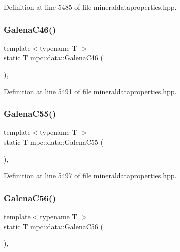 Definition at line 5485 of file mineraldataproperties.\+hpp.

\mbox{\label{namespacempc_1_1data_a7b178bd8cd598d73d1100edeb4187df5}} 
\subsubsection{\texorpdfstring{Galena\+C46()}{GalenaC46()}}
{\footnotesize\ttfamily template$<$typename T $>$ \\
static T mpc\+::data\+::\+Galena\+C46 (\begin{DoxyParamCaption}{ }\end{DoxyParamCaption})\hspace{0.3cm}{\ttfamily [inline]}, {\ttfamily [static]}}



Definition at line 5491 of file mineraldataproperties.\+hpp.

\mbox{\label{namespacempc_1_1data_af313ace575485953995b2685366462eb}} 
\subsubsection{\texorpdfstring{Galena\+C55()}{GalenaC55()}}
{\footnotesize\ttfamily template$<$typename T $>$ \\
static T mpc\+::data\+::\+Galena\+C55 (\begin{DoxyParamCaption}{ }\end{DoxyParamCaption})\hspace{0.3cm}{\ttfamily [inline]}, {\ttfamily [static]}}



Definition at line 5497 of file mineraldataproperties.\+hpp.

\mbox{\label{namespacempc_1_1data_a8e410cbee2b6d0dec211c004233bd7cc}} 
\subsubsection{\texorpdfstring{Galena\+C56()}{GalenaC56()}}
{\footnotesize\ttfamily template$<$typename T $>$ \\
static T mpc\+::data\+::\+Galena\+C56 (\begin{DoxyParamCaption}{ }\end{DoxyParamCaption})\hspace{0.3cm}{\ttfamily [inline]}, {\ttfamily [static]}}



